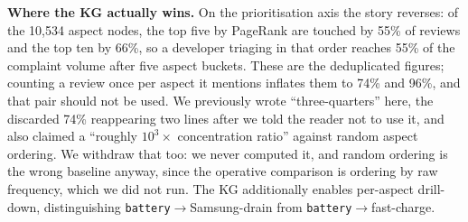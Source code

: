 \documentclass[11pt]{article}
\begin{document}
  \textbf{Where the KG actually wins.} On the prioritisation axis the story reverses: of the
  10{,}534 aspect nodes, the top five by PageRank are touched by 55\% of reviews and the top ten
  by 66\%, so a developer triaging in that order reaches 55\% of the complaint volume after five
  aspect buckets. These are the deduplicated figures; counting a review once per aspect it
  mentions inflates them to 74\% and 96\%, and that pair should not be used. We previously wrote
  ``three-quarters'' here, the discarded 74\% reappearing two lines after we told the reader not to
  use it, and also claimed a ``roughly $10^3\times$ concentration ratio'' against random aspect
  ordering. We withdraw that too: we never computed it, and random ordering is the wrong baseline
  anyway, since the operative comparison is ordering by raw frequency, which we did not run. The KG
  additionally enables per-aspect drill-down, distinguishing \texttt{battery}$\to$Samsung-drain
  from \texttt{battery}$\to$fast-charge.
\end{document}
